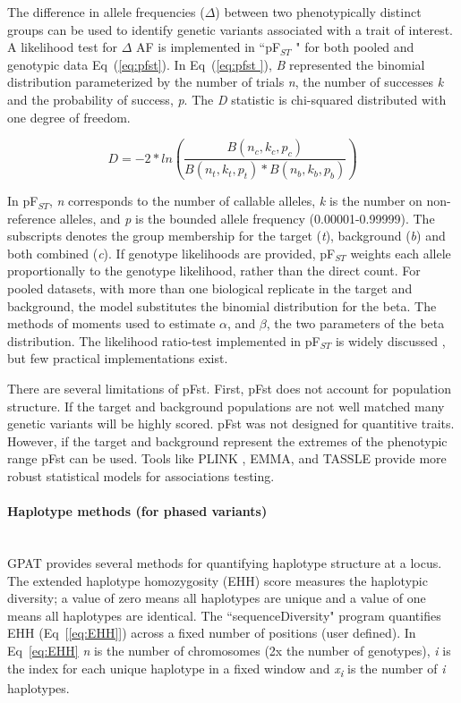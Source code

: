 \documentclass[10pt,letterpaper]{article}
\begin{document}
The difference in allele frequencies ($\Delta$) between two phenotypically distinct groups can be used to identify genetic variants associated with a trait of interest.  A likelihood test for $\Delta$ AF is implemented in ``pF$_{ST}$ " for both pooled and genotypic data Eq~(\ref{eq:pfst}).   In Eq~(\ref{eq:pfst }), \textit{B} represented the binomial distribution parameterized by the number of trials \textit{n}, the number of successes \textit{k} and the probability of success, \textit{p}.  The \textit{D} statistic is chi-squared distributed with one degree of freedom.

\begin{equation}\label{eq:pfst} 
D=-2* ln (\frac{ B(n_c,k_c,p_c) }{ B(n_t,k_t,p_t)*B(n_b,k_b,p_b)  })
\end{equation}

In pF$_{ST}$, \textit{n} corresponds to the number of callable alleles, \textit{k} is the number on non-reference alleles, and \textit{p} is the bounded allele frequency (0.00001-0.99999).  The subscripts denotes the group membership for the target (\textit{t}), background (\textit{b}) and both combined (\textit{c}).  If genotype likelihoods are provided, pF$_{ST}$  weights each allele proportionally to the genotype likelihood, rather than the direct count.   For pooled datasets, with more than one biological replicate in the target and background, the model substitutes the binomial distribution for the beta.  The methods of moments used to estimate $\alpha$, and $\beta$, the two parameters of the beta distribution.  The likelihood ratio-test implemented in pF$_{ST}$ is widely discussed \cite{kim,heng}, but few practical implementations exist.  

There are several limitations of pFst.  First, pFst does not account for population structure.  If the target and background populations are not well matched many genetic variants will be highly scored.  pFst was not designed for quantitive traits.  However, if the target and background represent the extremes of the phenotypic range pFst can be used.  Tools like PLINK \cite{plink}, EMMA\cite{emma}, and TASSLE\cite{tassel} provide more robust statistical models for associations testing.

\paragraph*{Haplotype methods (for phased variants) }\mbox{} \\

GPAT provides several methods for quantifying haplotype structure at a locus.  The extended haplotype homozygosity (EHH) score measures the haplotypic diversity; a value of zero means all haplotypes are unique and a value of one means all haplotypes are identical. The ``sequenceDiversity" program quantifies EHH (Eq~[\ref{eq:EHH}]) across a fixed number of positions (user defined). In Eq~\ref{eq:EHH} \textit{n} is the number of chromosomes (2x the number of genotypes), \textit{i} is the index for each unique haplotype in a fixed window and \textit{x\textsubscript{i}} is the number of \textit{i} haplotypes.  
\end{document}
